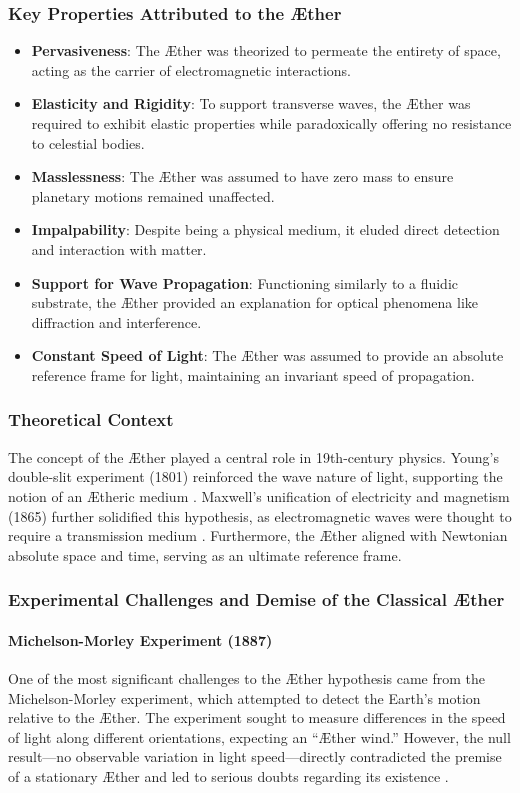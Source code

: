     \subsubsection*{Key Properties Attributed to the Æther}
    \begin{itemize}
        \item \textbf{Pervasiveness}: The Æther was theorized to permeate the entirety of space, acting as the carrier of electromagnetic interactions.
        \item \textbf{Elasticity and Rigidity}: To support transverse waves, the Æther was required to exhibit elastic properties while paradoxically offering no resistance to celestial bodies.
        \item \textbf{Masslessness}: The Æther was assumed to have zero mass to ensure planetary motions remained unaffected.
        \item \textbf{Impalpability}: Despite being a physical medium, it eluded direct detection and interaction with matter.
        \item \textbf{Support for Wave Propagation}: Functioning similarly to a fluidic substrate, the Æther provided an explanation for optical phenomena like diffraction and interference.
        \item \textbf{Constant Speed of Light}: The Æther was assumed to provide an absolute reference frame for light, maintaining an invariant speed of propagation.
    \end{itemize}

    \subsubsection*{Theoretical Context}
    The concept of the Æther played a central role in 19th-century physics. Young’s double-slit experiment (1801) reinforced the wave nature of light, supporting the notion of an Ætheric medium \cite{young1801}. Maxwell’s unification of electricity and magnetism (1865) further solidified this hypothesis, as electromagnetic waves were thought to require a transmission medium \cite{maxwell1865}. Furthermore, the Æther aligned with Newtonian absolute space and time, serving as an ultimate reference frame.

    \subsubsection*{Experimental Challenges and Demise of the Classical Æther}
    \paragraph*{Michelson-Morley Experiment (1887)}
    One of the most significant challenges to the Æther hypothesis came from the Michelson-Morley experiment, which attempted to detect the Earth’s motion relative to the Æther. The experiment sought to measure differences in the speed of light along different orientations, expecting an “Æther wind.” However, the null result—no observable variation in light speed—directly contradicted the premise of a stationary Æther and led to serious doubts regarding its existence \cite{michelson1887}.

